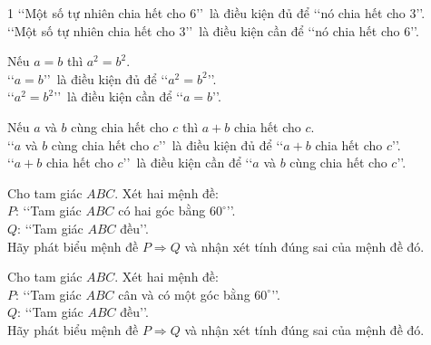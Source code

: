 \begin{bt}
{\begin{enumEX}{1}
			\lq\lq Một  số tự nhiên chia hết cho $6$\rq\rq\ là điều kiện đủ để \lq\lq nó chia hết cho $3$\rq\rq.\\
			\lq\lq Một số tự nhiên  chia hết cho $3$\rq\rq\ là điều kiện cần để \lq\lq nó chia hết cho $6$\rq\rq.
			\item Nếu $a=b$ thì  $a^2=b^2$.\\
			\lq\lq $a=b$\rq\rq\ là  điều kiện đủ để \lq\lq $a^2=b^2$\rq\rq.\\
			 \lq\lq $a^2=b^2$\rq\rq\ là điều kiện cần để \lq\lq $a=b$\rq\rq.
			\item Nếu $a$ và $b$ cùng chia hết cho $c$ thì $a+b$ chia hết cho $c$.\\ 
			\lq\lq $a$ và $b$ cùng chia hết cho $c$\rq\rq\ là điều kiện đủ để \lq\lq $a+b$ chia hết  cho $c$\rq\rq.\\
			\lq\lq $a+b$ chia hết cho $c$\rq\rq\ là điều kiện cần để \lq\lq $a$ và $b$ cùng chia hết  cho $c$\rq\rq.
		\end{enumEX}
	 }
\end{bt}

\begin{bt}[Mức độ 1]%
	Cho tam giác $ABC$. Xét hai mệnh đề:\\
	$P$: \lq \lq Tam giác $ABC$ có hai góc bằng $60^\circ$\rq \rq .\\
	$Q$: \lq \lq Tam giác $ABC$ đều\rq \rq. \\
	Hãy phát biểu  mệnh đề $P \Rightarrow Q$ và nhận xét tính đúng sai của mệnh đề đó.
\end{bt}

\begin{bt}[Mức độ 1]%
	Cho tam giác $ABC$. Xét hai mệnh đề:\\
	$P$: \lq \lq Tam giác $ABC$ cân và có một góc bằng $60^\circ$\rq \rq.\\
	$Q$: \lq \lq Tam giác $ABC$ đều\rq \rq. \\
	Hãy phát biểu  mệnh đề $P \Rightarrow Q$ và nhận xét tính đúng sai của mệnh đề đó.
\end{bt}

